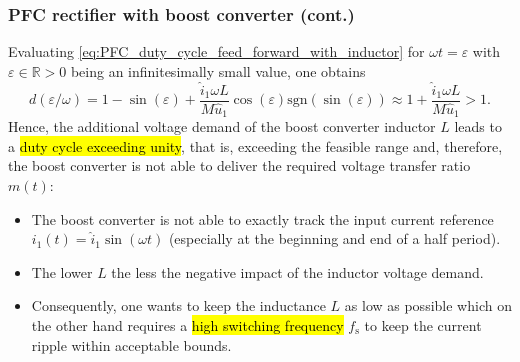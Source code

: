\begin{frame}
    \frametitle{PFC rectifier with boost converter (cont.)}
    Evaluating \eqref{eq:PFC_duty_cycle_feed_forward_with_inductor} for $\omega t = \varepsilon$ with $\varepsilon\in\mathbb{R}>0$ being an infinitesimally small value, one obtains 
    $$
    d(\varepsilon/\omega) = 1 -\sin(\varepsilon) + \frac{\hat{i}_1\omega L}{M\hat{u}_1} \cos(\varepsilon)\mathrm{sgn}(\sin(\varepsilon)) \approx 1 +  \frac{\hat{i}_1\omega L}{M\hat{u}_1} > 1. 
    $$\pause
    Hence, the additional voltage demand of the boost converter inductor $L$ leads to a \hl{duty cycle exceeding unity}, that is, exceeding the feasible range and, therefore, the boost converter is not able to deliver the required voltage transfer ratio $m(t)$:
    \begin{itemize}
        \item The boost converter is not able to exactly track the input current reference $i_1(t)=\hat{i}_1\sin(\omega t)$ (especially at the beginning and end of a half period).\pause
        \item The lower $L$ the less the negative impact of the inductor voltage demand.\pause
        \item Consequently, one wants to keep the inductance $L$ as low as possible which on the other hand requires a \hl{high switching frequency} $f_\mathrm{s}$ to keep the current ripple within acceptable bounds.
    \end{itemize}
\end{frame}

